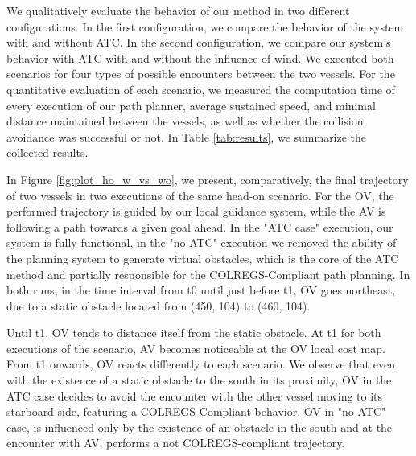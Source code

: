         We qualitatively evaluate the behavior of our method in two different configurations. In the first configuration, we compare the behavior of the system with and without \ac{ATC}.  In the second configuration, we compare our system's behavior with \ac{ATC} with and without the influence of wind. We executed both scenarios for four types of possible encounters between the two vessels. For the quantitative evaluation of each scenario, we measured the computation time of every execution of our path planner, average sustained speed, and minimal distance maintained between the vessels, as well as whether the collision avoidance was successful or not. In Table \ref{tab:results}, we summarize the collected results.

        In Figure \ref{fig:plot_ho_w_vs_wo}, we present, comparatively, the final trajectory of two vessels in two executions of the same head-on scenario. For the \ac{OV}, the performed trajectory is guided by our local guidance system, while the \ac{AV} is following a path towards a given goal ahead. In the "ATC case" execution, our system is fully functional, in the "no ATC" execution we removed the ability of the planning system to generate virtual obstacles, which is the core of the \ac{ATC} method and partially responsible for the \ac{COLREGS}-Compliant path planning. In both runs, in the time interval from t0 until just before t1, \ac{OV} goes northeast, due to a static obstacle located from (450, 104) to (460, 104). 
        
        Until t1, \ac{OV} tends to distance itself from the static obstacle. At t1 for both executions of the scenario, \ac{AV} becomes noticeable at the \ac{OV} local cost map. From t1 onwards, \ac{OV} reacts differently to each scenario. We observe that even with the existence of a static obstacle to the south in its proximity, \ac{OV} in the \ac{ATC} case decides to avoid the encounter with the other vessel moving to its starboard side, featuring a \ac{COLREGS}-Compliant behavior. \ac{OV} in "no ATC" case, is influenced only by the existence of an obstacle in the south and at the encounter with \ac{AV}, performs a not \ac{COLREGS}-compliant trajectory.

